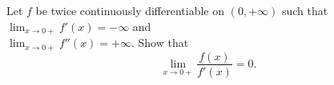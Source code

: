 \documentclass{article}
\begin{document}
	\setlength{\parindent}{0pt}
	Let $f$ be twice continuously differentiable on $(0,+\infty)$ such that $\lim_{x\to0+}f'(x)=-\infty$ and \\
	$\lim_{x\to0+}f''(x)=+\infty$. Show that
	$$\lim_{x\to0+}\frac{f(x)}{f'(x)}=0.$$
\end{document}

